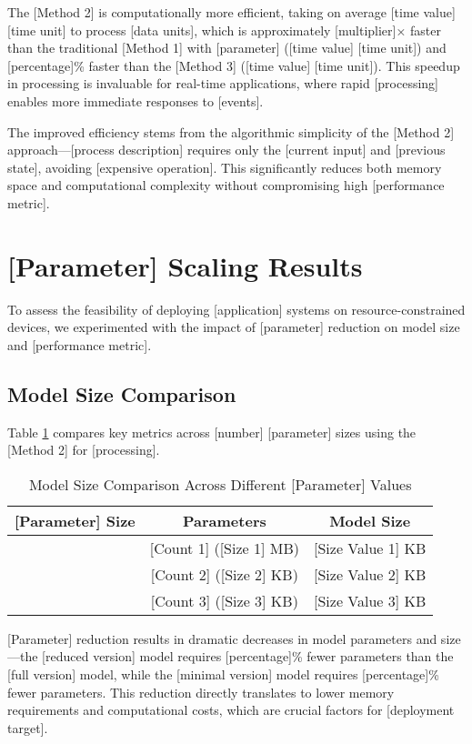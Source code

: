 The [Method 2] is computationally more efficient, taking on average [time value] [time unit] to process [data units], which is approximately [multiplier]× faster than the traditional [Method 1] with [parameter] ([time value] [time unit]) and [percentage]\% faster than the [Method 3] ([time value] [time unit]). This speedup in processing is invaluable for real-time applications, where rapid [processing] enables more immediate responses to [events].

The improved efficiency stems from the algorithmic simplicity of the [Method 2] approach—[process description] requires only the [current input] and [previous state], avoiding [expensive operation]. This significantly reduces both memory space and computational complexity without compromising high [performance metric].

\section{[Parameter] Scaling Results}

To assess the feasibility of deploying [application] systems on resource-constrained devices, we experimented with the impact of [parameter] reduction on model size and [performance metric].

\subsection{Model Size Comparison}

Table \ref{tab:model_size_comparison} compares key metrics across [number] [parameter] sizes using the [Method 2] for [processing].

\begin{table}[htbp]
\caption{Model Size Comparison Across Different [Parameter] Values}
\label{tab:model_size_comparison}
\begin{tabular}{|l|c|c|}
\hline
\textbf{[Parameter] Size} & \textbf{Parameters} & \textbf{Model Size} \\
\hline
[Value 1] & [Count 1] ([Size 1] MB) & [Size Value 1] KB \\
[Value 2] & [Count 2] ([Size 2] KB) & [Size Value 2] KB \\
[Value 3] & [Count 3] ([Size 3] KB) & [Size Value 3] KB \\
\hline
\end{tabular}
\end{table}

[Parameter] reduction results in dramatic decreases in model parameters and size—the [reduced version] model requires [percentage]\% fewer parameters than the [full version] model, while the [minimal version] model requires [percentage]\% fewer parameters. This reduction directly translates to lower memory requirements and computational costs, which are crucial factors for [deployment target].

